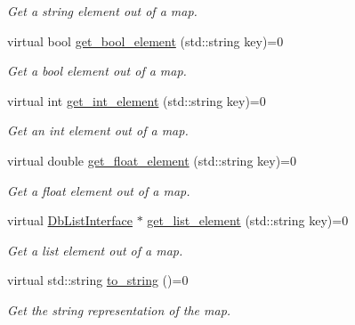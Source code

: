 \begin{DoxyCompactItemize}
\begin{DoxyCompactList}\small\item\em Get a string element out of a map. \end{DoxyCompactList}\item 
virtual bool \hyperlink{classDbMapInterface_a402f75085fa2dacc8808d4b3650bd652}{get\+\_\+bool\+\_\+element} (std\+::string key)=0\hypertarget{classDbMapInterface_a402f75085fa2dacc8808d4b3650bd652}{}\label{classDbMapInterface_a402f75085fa2dacc8808d4b3650bd652}

\begin{DoxyCompactList}\small\item\em Get a bool element out of a map. \end{DoxyCompactList}\item 
virtual int \hyperlink{classDbMapInterface_af64b01be1c5046a7f24ad6ca0679eb2e}{get\+\_\+int\+\_\+element} (std\+::string key)=0\hypertarget{classDbMapInterface_af64b01be1c5046a7f24ad6ca0679eb2e}{}\label{classDbMapInterface_af64b01be1c5046a7f24ad6ca0679eb2e}

\begin{DoxyCompactList}\small\item\em Get an int element out of a map. \end{DoxyCompactList}\item 
virtual double \hyperlink{classDbMapInterface_ae621d8af1d1a181790e4af2377caae3a}{get\+\_\+float\+\_\+element} (std\+::string key)=0\hypertarget{classDbMapInterface_ae621d8af1d1a181790e4af2377caae3a}{}\label{classDbMapInterface_ae621d8af1d1a181790e4af2377caae3a}

\begin{DoxyCompactList}\small\item\em Get a float element out of a map. \end{DoxyCompactList}\item 
virtual \hyperlink{classDbListInterface}{Db\+List\+Interface} $\ast$ \hyperlink{classDbMapInterface_aa6cdf8e968d4f5c46e9f24abff10133d}{get\+\_\+list\+\_\+element} (std\+::string key)=0\hypertarget{classDbMapInterface_aa6cdf8e968d4f5c46e9f24abff10133d}{}\label{classDbMapInterface_aa6cdf8e968d4f5c46e9f24abff10133d}

\begin{DoxyCompactList}\small\item\em Get a list element out of a map. \end{DoxyCompactList}\item 
virtual std\+::string \hyperlink{classDbMapInterface_ad42e26caf01cf8bae0f98db95e32202c}{to\+\_\+string} ()=0\hypertarget{classDbMapInterface_ad42e26caf01cf8bae0f98db95e32202c}{}\label{classDbMapInterface_ad42e26caf01cf8bae0f98db95e32202c}

\begin{DoxyCompactList}\small\item\em Get the string representation of the map. \end{DoxyCompactList}\end{DoxyCompactItemize}


